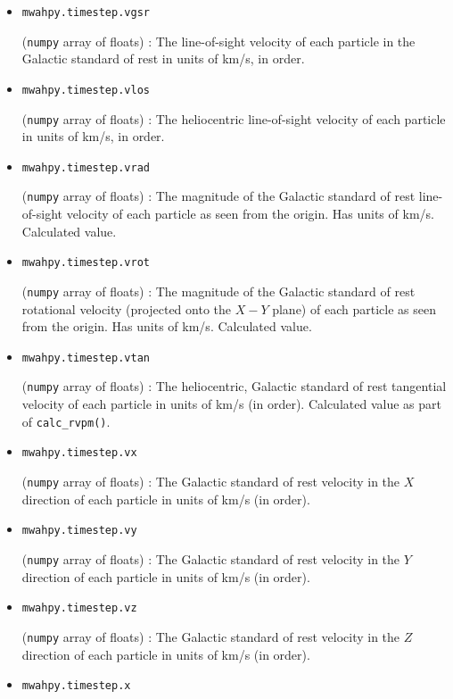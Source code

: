 \documentclass{article}
\begin{document}
\begin{itemize}
\item \verb!mwahpy.timestep.vgsr!

(\verb!numpy! array of floats) : The line-of-sight velocity of each particle in the Galactic standard of rest in units of km/s, in order.

\item \verb!mwahpy.timestep.vlos!

(\verb!numpy! array of floats) : The heliocentric line-of-sight velocity of each particle in units of km/s, in order.

\item \verb!mwahpy.timestep.vrad!

(\verb!numpy! array of floats) : The magnitude of the Galactic standard of rest line-of-sight velocity of each particle as seen from the origin. Has units of km/s. Calculated value.

\item \verb!mwahpy.timestep.vrot!

(\verb!numpy! array of floats) : The magnitude of the Galactic standard of rest rotational velocity (projected onto the $X-Y$ plane) of each particle as seen from the origin. Has units of km/s. Calculated value.

\item \verb!mwahpy.timestep.vtan!

(\verb!numpy! array of floats) : The heliocentric, Galactic standard of rest tangential velocity of each particle in units of km/s (in order). Calculated value as part of \verb!calc_rvpm()!.

\item \verb!mwahpy.timestep.vx!

(\verb!numpy! array of floats) : The Galactic standard of rest velocity in the $X$ direction of each particle in units of km/s (in order). 

\item \verb!mwahpy.timestep.vy!

(\verb!numpy! array of floats) : The Galactic standard of rest velocity in the $Y$ direction of each particle in units of km/s (in order). 

\item \verb!mwahpy.timestep.vz!

(\verb!numpy! array of floats) : The Galactic standard of rest velocity in the $Z$ direction of each particle in units of km/s (in order).  

\item \verb!mwahpy.timestep.x!


\end{itemize}
\end{document}
